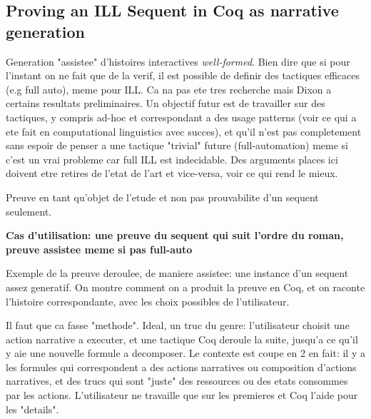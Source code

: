 \documentclass[runningheads,a4paper]{llncs}
\begin{document}
\subsection{Proving an ILL Sequent in Coq as narrative generation}
Generation "assistee" d'histoires interactives \emph{well-formed}. Bien dire que si pour l'instant on ne fait que de la verif, il est possible de definir des tactiques efficaces (e.g full auto), meme pour ILL. Ca na pas ete tres recherche mais Dixon a certains resultats preliminaires. Un objectif futur est de travailler sur des tactiques, y compris ad-hoc et correspondant a des usage patterns (voir ce qui a ete fait en computational linguistics avec succes), et qu'il n'est pas completement sans espoir de penser a une tactique "trivial" future (full-automation) meme si c'est un vrai probleme car full ILL est indecidable. Des arguments places ici doivent etre retires de l'etat de l'art et vice-versa, voir ce qui rend le mieux.

Preuve en tant qu'objet de l'etude et non pas prouvabilite d'un sequent seulement.

\textbf{Cas d'utilisation: une preuve du sequent qui suit l'ordre du roman, preuve assistee meme si pas full-auto}

Exemple de la preuve deroulee, de maniere assistee: une instance d'un sequent assez generatif. On montre comment on a produit la preuve en Coq, et on raconte l'histoire correspondante, avec les choix possibles de l'utilisateur. 

Il faut que ca fasse "methode". Ideal, un truc du genre: l'utilisateur choisit une action narrative a executer, et une tactique Coq deroule la suite, jusqu'a ce qu'il y aie une nouvelle formule a decomposer. Le contexte est coupe en 2 en fait: il y a les formules qui correspondent a des actions narratives ou composition d'actions narratives, et des trucs qui sont "juste" des ressources ou des etats consommes par les actions. L'utilisateur ne travaille que sur les premieres et Coq l'aide pour les "details".
\end{document}
